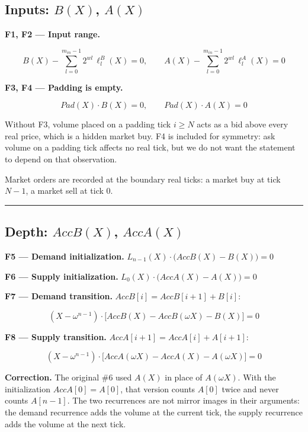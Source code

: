 \subsection{\texorpdfstring{Inputs: \(B(X)\), \(A(X)\)}{Inputs: B(X), A(X)}}

\textbf{F1, F2 --- Input range.}

\[B(X) - \sum_{l=0}^{m_{in}-1} 2^{wl}\, \ell^{B}_l(X) = 0, \qquad A(X) - \sum_{l=0}^{m_{in}-1} 2^{wl}\, \ell^{A}_l(X) = 0\]

\textbf{F3, F4 --- Padding is empty.}

\[Pad(X) \cdot B(X) = 0, \qquad Pad(X) \cdot A(X) = 0\]

Without F3, volume placed on a padding tick \(i \ge N\) acts as a bid above every real price, which is a hidden market buy. F4 is included for symmetry: ask volume on a padding tick affects no real tick, but we do not want the statement to depend on that observation.

Market orders are recorded at the boundary real ticks: a market buy at tick \(N-1\), a market sell at tick \(0\).

\begin{center}\rule{0.5\linewidth}{0.5pt}\end{center}

\subsection{\texorpdfstring{Depth: \(AccB(X)\), \(AccA(X)\)}{Depth: AccB(X), AccA(X)}}

\textbf{F5 --- Demand initialization.} \(L_{n-1}(X) \cdot \big(AccB(X) - B(X)\big) = 0\)

\textbf{F6 --- Supply initialization.} \(L_{0}(X) \cdot \big(AccA(X) - A(X)\big) = 0\)

\textbf{F7 --- Demand transition.} \(AccB[i] = AccB[i+1] + B[i]\):

\[(X - \omega^{n-1}) \cdot \big[AccB(X) - AccB(\omega X) - B(X)\big] = 0\]

\textbf{F8 --- Supply transition.} \(AccA[i+1] = AccA[i] + A[i+1]\):

\[(X - \omega^{n-1}) \cdot \big[AccA(\omega X) - AccA(X) - A(\omega X)\big] = 0\]

\textbf{Correction.} The original \#6 used \(A(X)\) in place of \(A(\omega X)\). With the initialization \(AccA[0] = A[0]\), that version counts \(A[0]\) twice and never counts \(A[n-1]\). The two recurrences are not mirror images in their arguments: the demand recurrence adds the volume at the current tick, the supply recurrence adds the volume at the next tick.

